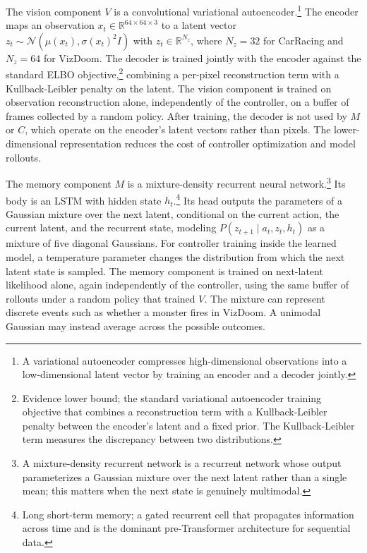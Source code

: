 The vision component $V$ is a convolutional variational autoencoder.\footnote{A variational autoencoder compresses high-dimensional observations into a low-dimensional latent vector by training an encoder and a decoder jointly.} The encoder maps an observation $x_t \in \mathbb{R}^{64 \times 64 \times 3}$ to a latent vector $z_t \sim \mathcal{N}(\mu(x_t), \sigma(x_t)^2 I)$ with $z_t \in \mathbb{R}^{N_z}$, where $N_z = 32$ for CarRacing and $N_z = 64$ for VizDoom. The decoder is trained jointly with the encoder against the standard ELBO objective,\footnote{Evidence lower bound; the standard variational autoencoder training objective that combines a reconstruction term with a Kullback-Leibler penalty between the encoder's latent and a fixed prior. The Kullback-Leibler term measures the discrepancy between two distributions.} combining a per-pixel reconstruction term with a Kullback-Leibler penalty on the latent. The vision component is trained on observation reconstruction alone, independently of the controller, on a buffer of frames collected by a random policy. After training, the decoder is not used by $M$ or $C$, which operate on the encoder's latent vectors rather than pixels. The lower-dimensional representation reduces the cost of controller optimization and model rollouts.

The memory component $M$ is a mixture-density recurrent neural network.\footnote{A mixture-density recurrent network is a recurrent network whose output parameterizes a Gaussian mixture over the next latent rather than a single mean; this matters when the next state is genuinely multimodal.} Its body is an LSTM with hidden state $h_t$.\footnote{Long short-term memory; a gated recurrent cell that propagates information across time and is the dominant pre-Transformer architecture for sequential data.} Its head outputs the parameters of a Gaussian mixture over the next latent, conditional on the current action, the current latent, and the recurrent state, modeling $P(z_{t+1} \mid a_t, z_t, h_t)$ as a mixture of five diagonal Gaussians. For controller training inside the learned model, a temperature parameter changes the distribution from which the next latent state is sampled. The memory component is trained on next-latent likelihood alone, again independently of the controller, using the same buffer of rollouts under a random policy that trained $V$. The mixture can represent discrete events such as whether a monster fires in VizDoom. A unimodal Gaussian may instead average across the possible outcomes.

